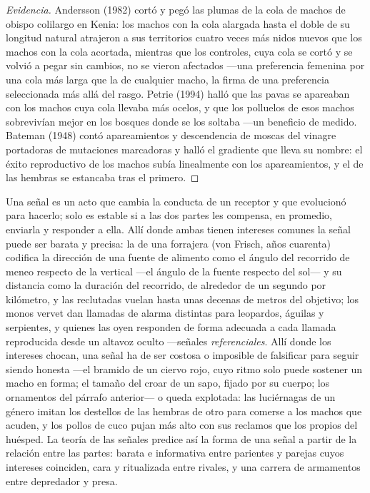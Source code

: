 \begin{proof}[Evidencia]
Andersson (1982) cortó y pegó las plumas de la cola de machos de
obispo colilargo en Kenia: los machos con la cola alargada hasta el
doble de su longitud natural atrajeron a sus territorios cuatro veces
más nidos nuevos que los machos con la cola acortada, mientras que los
controles, cuya cola se cortó y se volvió a pegar sin cambios, no se
vieron afectados ---una preferencia femenina por una cola más larga que
la de cualquier macho, la firma de una preferencia seleccionada más
allá del rasgo. Petrie (1994) halló que las pavas se apareaban con los
machos cuya cola llevaba más ocelos, y que los polluelos de esos machos
sobrevivían mejor en los bosques donde se los soltaba ---un beneficio de
 medido. Bateman (1948) contó apareamientos y descendencia
de moscas del vinagre portadoras de mutaciones marcadoras y halló el
gradiente que lleva su nombre: el éxito reproductivo de los machos
subía linealmente con los apareamientos, y el de las hembras se
estancaba tras el primero.
\end{proof}

\begin{proposition}\label{prop:b3:behavioural-ecology:signals}
Una señal es un acto que cambia la conducta de un receptor y que
evolucionó para hacerlo; solo es estable si a las dos partes les
compensa, en promedio, enviarla y responder a ella. Allí donde ambas
tienen intereses comunes la señal puede ser barata y precisa: la
\emph{} de una forrajera (von Frisch, años cuarenta)
codifica la dirección de una fuente de alimento como el ángulo del
recorrido de meneo respecto de la vertical ---el ángulo de la fuente
respecto del sol--- y su distancia como la duración del recorrido, de
alrededor de un segundo por kilómetro, y las reclutadas vuelan hasta
unas decenas de metros del objetivo; los monos vervet dan llamadas de
alarma distintas para leopardos, águilas y serpientes, y quienes las
oyen responden de forma adecuada a cada llamada reproducida desde un
altavoz oculto ---señales \emph{referenciales}. Allí donde los intereses
chocan, una señal ha de ser costosa o imposible de falsificar para
seguir siendo honesta ---el bramido de un ciervo rojo, cuyo ritmo solo
puede sostener un macho en forma; el tamaño del croar de un sapo,
fijado por su cuerpo; los ornamentos del párrafo anterior--- o queda
explotada: las luciérnagas de un género imitan los destellos de las
hembras de otro para comerse a los machos que acuden, y los pollos de
cuco pujan más alto con sus reclamos que los propios del huésped. La
teoría de las señales predice así la forma de una señal a partir de la
relación entre las partes: barata e informativa entre parientes y
parejas cuyos intereses coinciden, cara y ritualizada entre rivales, y
una carrera de armamentos entre depredador y presa.
\end{proposition}
\admitted


